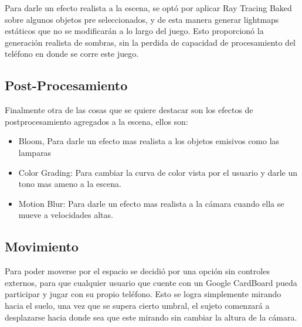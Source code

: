 Para darle un efecto realista a la escena, se optó por aplicar Ray Tracing Baked sobre algunos objetos pre seleccionados, y de esta manera generar lightmaps estáticos que no se modificarán a lo largo del juego. Esto proporcionó la generación realista de sombras, sin la perdida de capacidad de procesamiento del teléfono en donde se corre este juego.

\subsection{Post-Procesamiento}

Finalmente otra de las cosas que se quiere destacar son los efectos de postprocesamiento agregados a la escena, ellos son:

\begin{itemize}
    \item Bloom, Para darle un efecto mas realista a los objetos emisivos como las lamparas
    \item Color Grading: Para cambiar la curva de color vista por el usuario y darle un tono mas ameno a la escena.
    \item Motion Blur: Para darle un efecto mas realista a la cámara cuando ella se mueve a velocidades altas.
\end{itemize}

\subsection{Movimiento}

Para poder moverse por el espacio se decidió por una opción sin controles externos, para que cualquier usuario que cuente con un Google CardBoard pueda participar y jugar con su propio teléfono. Esto se logra simplemente mirando hacia el suelo, una vez que se supera cierto umbral, el sujeto comenzará a desplazarse hacia donde sea que este mirando sin cambiar la altura de la cámara.